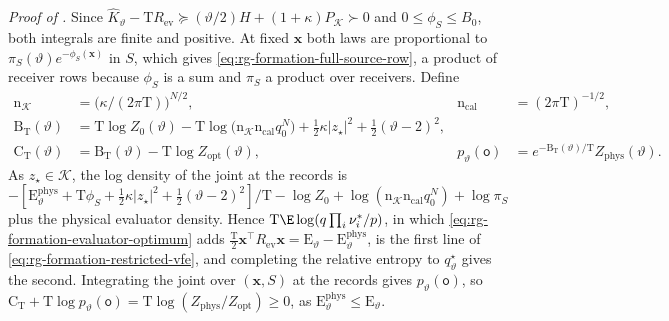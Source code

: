 \noindent\emph{Proof of .}
Since \(\widehat K_\vartheta-\mathrm TR_{\mathrm{ev}}\succeq(\vartheta/2)H
+(1+\kappa)P_{\mathcal K}\succ0\) and \(0\le\phi_S\le B_0\), both integrals are
finite and positive. At fixed \(\mathbf x\) both laws are proportional to
\(\pi_S(\vartheta)e^{-\phi_S(\mathbf x)}\) in \(S\), which gives
\cref{eq:rg-formation-full-source-row}, a product of receiver rows because
\(\phi_S\) is a sum and \(\pi_S\) a product over receivers. Define
\begin{equation}
\begin{aligned}
\mathrm n_{\mathcal K}&=\bigl(\kappa/(2\pi\mathrm T)\bigr)^{N/2},&
\mathrm n_{\mathrm{cal}}&=(2\pi\mathrm T)^{-1/2},\\
\mathrm B_{\mathrm T}(\vartheta)
 &=\mathrm T\log Z_0(\vartheta)
   -\mathrm T\log\bigl(\mathrm n_{\mathcal K}\mathrm n_{\mathrm{cal}}q_0^N\bigr)
   +\tfrac12\kappa|z_\star|^2+\tfrac12(\vartheta-2)^2,\\
\mathrm C_{\mathrm T}(\vartheta)&=\mathrm B_{\mathrm T}(\vartheta)
   -\mathrm T\log Z_{\mathrm{opt}}(\vartheta),&
p_\vartheta(\mathsf o)&=e^{-\mathrm B_{\mathrm T}(\vartheta)/\mathrm T}
                         Z_{\mathrm{phys}}(\vartheta).
\end{aligned}
\label{eq:rg-formation-evidence-scalar}
\end{equation}
As \(z_\star\in\mathcal K\), the log density of the joint at the records is
\(-[\mathrm E^{\mathrm{phys}}_\vartheta+\mathrm T\phi_S+\tfrac12\kappa|z_\star|^2
+\tfrac12(\vartheta-2)^2]/\mathrm T-\log Z_0
+\log(\mathrm n_{\mathcal K}\mathrm n_{\mathrm{cal}}q_0^N)+\log\pi_S\) plus the
physical evaluator density. Hence \(\mathrm T\E\log(q\prod_i\nu_i^*/p)\), in
which \cref{eq:rg-formation-evaluator-optimum} adds
\(\tfrac{\mathrm T}2\mathbf x^\top R_{\mathrm{ev}}\mathbf x
=\mathrm E_\vartheta-\mathrm E^{\mathrm{phys}}_\vartheta\), is the first line
of \cref{eq:rg-formation-restricted-vfe}, and completing the relative entropy
to \(q^\star_\vartheta\) gives the second. Integrating the joint over
\((\mathbf x,S)\) at the records gives \(p_\vartheta(\mathsf o)\), so
\(\mathrm C_{\mathrm T}+\mathrm T\log p_\vartheta(\mathsf o)
=\mathrm T\log(Z_{\mathrm{phys}}/Z_{\mathrm{opt}})\ge0\), as
\(\mathrm E^{\mathrm{phys}}_\vartheta\le\mathrm E_\vartheta\).

